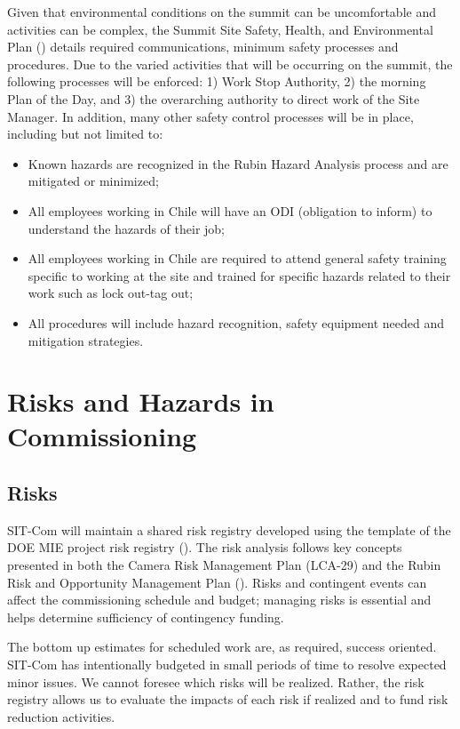 \documentclass[SE,lsstdraft,authoryear,toc]{lsstdoc, lsstdraft}
\begin{document}
Given that environmental conditions on the summit can be uncomfortable and activities can be complex, the Summit Site Safety, Health, and Environmental Plan () details required communications, minimum safety processes and procedures.
Due to the varied activities that will be occurring on the summit, the following processes will be enforced: 1) Work Stop Authority, 2) the morning Plan of the Day, and 3) the overarching authority to direct work of the Site Manager.  In addition, many other safety control processes will be in place, including but not limited to:
\begin{itemize}
    \item Known hazards are recognized in the Rubin Hazard Analysis process and are mitigated or minimized;
    \item All employees working in Chile will have an ODI (obligation to inform) to understand the hazards of their job;
    \item All employees working in Chile are required to attend general safety training specific to working at the site and trained for specific hazards related to their work such as lock out-tag out;
    \item All procedures will include hazard recognition, safety equipment needed and mitigation strategies.
\end{itemize}


\section{Risks and Hazards in Commissioning}
\subsection{Risks}
SIT-Com will maintain a shared risk registry developed using the template of the DOE MIE project risk registry ().
The risk analysis follows key concepts presented in both the Camera Risk Management Plan (LCA-29) and the Rubin Risk and Opportunity Management Plan ().
Risks and contingent events can affect the commissioning schedule and budget; managing risks is essential and helps determine sufficiency of contingency funding.

The bottom up estimates for scheduled work are, as required, success oriented.
SIT-Com has intentionally budgeted in small periods of time to resolve expected minor issues.
We cannot foresee which risks will be realized.
Rather, the risk registry allows us to evaluate the impacts of each risk if realized and to fund risk reduction activities.
\end{document}
